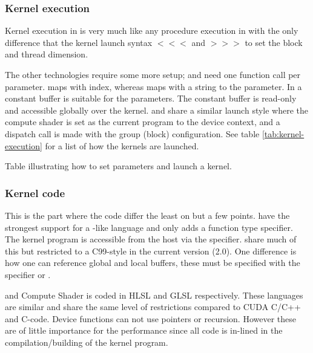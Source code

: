 \subsubsection{Kernel execution}

Kernel execution in {\CU} is very much like any procedure execution in {\CPP} with the only difference that the kernel launch syntax $<<<$ and $>>>$ to set the block and thread dimension.

The other technologies require some more setup; {\OCL} and {\GL} need one function call per parameter. {\OCL} maps with index, whereas {\GL} maps with a string to the parameter. In {\DX} a constant buffer is suitable for the parameters. The constant buffer is read-only and accessible globally over the kernel. {\DX} and {\GL} share a similar launch style where the compute shader is set as the current program to the device context, and a dispatch call is made with the group (block) configuration. See table \ref{tab:kernel-execution} for a list of how the kernels are launched.

\begin{table}[H]
	\centering
	
	\caption{Table illustrating how to set parameters and launch a kernel.}
	\label{tab:kernel-execution}
\end{table}

\subsubsection{Kernel code}

This is the part where the code differ the least on but a few points. {\CU} have the strongest support for a {\CPP} -like language and only adds a function type specifier. The kernel program is accessible from the host via the  specifier. {\OCL} share much of this but restricted to a C99-style in the current version (2.0). One difference is how one can reference global and local buffers, these must be specified with the specifier  or .

{\DX} and {\GL} Compute Shader is coded in \gls{HLSL} and \gls{GLSL} respectively. These languages are similar and share the same level of restrictions compared to CUDA C/C++ and {\OCL} C-code. Device functions can not use pointers or recursion. However these are of little importance for the performance since all code is in-lined in the compilation/building of the kernel program.

